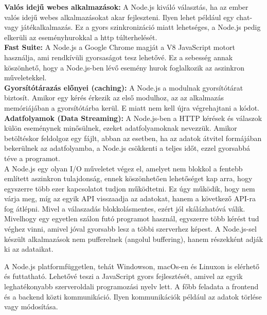 \textbf{Valós idejű webes alkalmazások:} A Node.js kiváló választás, ha az ember valós idejű webes alkalmazásokat akar fejleszteni. Ilyen lehet például egy chat- vagy játékalkalmazás. Ez a gyors szinkronizáció miatt lehetséges, a Node.js pedig elkerüli az eseményhurokkal a http túlterhelését.\\

\textbf{Fast Suite:} A Node.js a Google Chrome magját a V8 JavaScript motort használja, ami rendkívüli gyorsaságot tesz lehetővé. Ez a sebesség annak köszönhető, hogy a Node.js-ben lévő esemény hurok foglalkozik az aszinkron műveletekkel.\\

\textbf{Gyorsítótárazás előnyei (caching):} A Node.js a modulnak gyorsítótárat biztosít. Amikor egy kérés érkezik az első modulhoz, az az alkalmazás memóriájában a gyorsítótárba kerül. E miatt nem kell újra végrehajtani a kódot.\\

\textbf{Adatfolyamok (Data Streaming):} A Node.js-ben a HTTP kérések és válaszok külön eseménynek minősülnek, ezeket adatfolyamoknak nevezzük. Amikor betöltéskor feldolgoz egy fájlt, abban az esetben, ha az adatok átvitel formájában bekerülnek az adatfolyamba, a Node.js csökkenti a teljes időt, ezzel gyorsabbá téve a programot.\\

A Node.js egy olyan I/O műveletet végez el, amelyet nem blokkol a fentebb említett aszinkron tulajdonság, ennek köszönhetően lehetőséget kap arra, hogy egyszerre több ezer kapcsolatot tudjon működtetni. Ez úgy működik, hogy nem várja meg, míg az egyik API visszaadja az adatokat, hanem a következő API-ra fog átlépni. Mivel a válaszadás blokkolásmentes, ezért jól skálázhatóvá válik. Mivelhogy egy egyetlen szálon futó programot használ, egyszerre több kérést tud véghez vinni, amivel jóval gyorsabb lesz a többi szerverhez képest. A Node.js-sel készült alkalmazások nem pufferelnek (angolul buffering), hanem részekként adják ki az adataikat.

A Node.js platformfüggetlen, tehát Windowson, macOs-en és Linuxon is elérhető és futtatható. Lehetővé teszi a JavaScript gyors fejlesztését, amivel az egyik leghatékonyabb szerveroldali programozási nyelv lett. A főbb feladata a frontend és a backend közti kommunikáció. Ilyen kommunikációk például az adatok törlése vagy módosítása.

